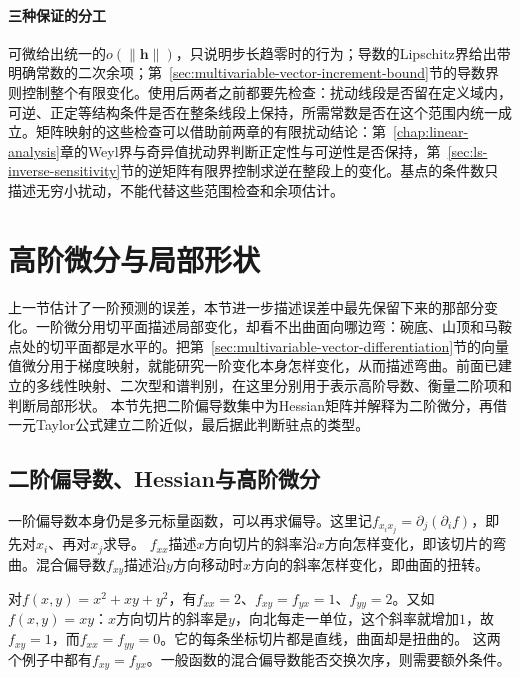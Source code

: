 \paragraph{三种保证的分工}
可微给出统一的$o(\lVert\bm h\rVert)$，只说明步长趋零时的行为；导数的Lipschitz界给出带明确常数的二次余项；第~\ref{sec:multivariable-vector-increment-bound}节的导数界则控制整个有限变化。使用后两者之前都要先检查：扰动线段是否留在定义域内，可逆、正定等结构条件是否在整条线段上保持，所需常数是否在这个范围内统一成立。矩阵映射的这些检查可以借助前两章的有限扰动结论：第~\ref{chap:linear-analysis}章的Weyl界与奇异值扰动界判断正定性与可逆性是否保持，第~\ref{sec:ls-inverse-sensitivity}节的逆矩阵有限界控制求逆在整段上的变化。基点的条件数只描述无穷小扰动，不能代替这些范围检查和余项估计。

\section{高阶微分与局部形状}
\label{sec:multivariable-curvature-error}

上一节估计了一阶预测的误差，本节进一步描述误差中最先保留下来的那部分变化。一阶微分用切平面描述局部变化，却看不出曲面向哪边弯：碗底、山顶和马鞍点处的切平面都是水平的。把第~\ref{sec:multivariable-vector-differentiation}节的向量值微分用于梯度映射，就能研究一阶变化本身怎样变化，从而描述弯曲。前面已建立的多线性映射、二次型和谱判别，在这里分别用于表示高阶导数、衡量二阶项和判断局部形状。
本节先把二阶偏导数集中为Hessian矩阵并解释为二阶微分，再借一元Taylor公式建立二阶近似，最后据此判断驻点的类型。

\subsection{二阶偏导数、Hessian与高阶微分}

一阶偏导数本身仍是多元标量函数，可以再求偏导。这里记$f_{x_i x_j}=\partial_j(\partial_i f)$，即先对$x_i$、再对$x_j$求导。
$f_{xx}$描述$x$方向切片的斜率沿$x$方向怎样变化，即该切片的弯曲。混合偏导数$f_{xy}$描述沿$y$方向移动时$x$方向的斜率怎样变化，即曲面的扭转。

对$f(x,y)=x^2+xy+y^2$，有$f_{xx}=2$、$f_{xy}=f_{yx}=1$、$f_{yy}=2$。又如$f(x,y)=xy$：$x$方向切片的斜率是$y$，向北每走一单位，这个斜率就增加$1$，故$f_{xy}=1$，而$f_{xx}=f_{yy}=0$。它的每条坐标切片都是直线，曲面却是扭曲的。
这两个例子中都有$f_{xy}=f_{yx}$。一般函数的混合偏导数能否交换次序，则需要额外条件。

